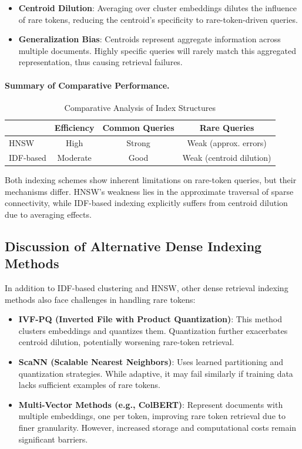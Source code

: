 \documentclass[manuscript]{acmart}
\begin{document}
\begin{itemize}
  \item \textbf{Centroid Dilution}: Averaging over cluster embeddings dilutes the influence of rare tokens, reducing the centroid's specificity to rare-token-driven queries.
  \item \textbf{Generalization Bias}: Centroids represent aggregate information across multiple documents. Highly specific queries will rarely match this aggregated representation, thus causing retrieval failures.
\end{itemize}

\paragraph{Summary of Comparative Performance.}
\begin{table}[h!]
  \centering
  \begin{tabular}{lccc}
    \toprule
    & Efficiency & Common Queries & Rare Queries \\
    \midrule
    HNSW & High & Strong & Weak (approx. errors) \\
    IDF-based & Moderate & Good & Weak (centroid dilution) \\
    \bottomrule
  \end{tabular}
  \caption{Comparative Analysis of Index Structures}
  \label{tab:comparison}
\end{table}

Both indexing schemes show inherent limitations on rare-token queries, but their mechanisms differ. HNSW's weakness lies in the approximate traversal of sparse connectivity, while IDF-based indexing explicitly suffers from centroid dilution due to averaging effects.

\subsection{Discussion of Alternative Dense Indexing Methods}

In addition to IDF-based clustering and HNSW, other dense retrieval indexing methods also face challenges in handling rare tokens:

\begin{itemize}
  \item \textbf{IVF-PQ (Inverted File with Product Quantization)}: This method clusters embeddings and quantizes them. Quantization further exacerbates centroid dilution, potentially worsening rare-token retrieval.
  \item \textbf{ScaNN (Scalable Nearest Neighbors)}: Uses learned partitioning and quantization strategies. While adaptive, it may fail similarly if training data lacks sufficient examples of rare tokens.
  \item \textbf{Multi-Vector Methods (e.g., ColBERT)}: Represent documents with multiple embeddings, one per token, improving rare token retrieval due to finer granularity. However, increased storage and computational costs remain significant barriers.
\end{itemize}
\end{document}

